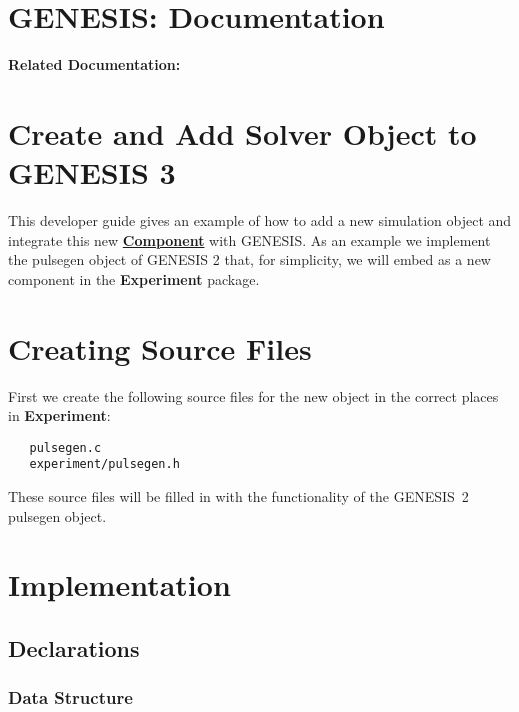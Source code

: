 \documentclass[12pt]{article}
\begin{document}
\section*{GENESIS: Documentation}

{\bf Related Documentation:}

\section*{Create and Add Solver Object to GENESIS 3}

This developer guide gives an example of how to add a new simulation
object and integrate this new
\href{../reserved-words/reserved-words.tex}{\bf Component} with
GENESIS.  As an example we implement the pulsegen object of GENESIS 2
that, for simplicity, we will embed as a new component in the {\bf
  Experiment} package.

\section*{Creating Source Files}

First we create the following source files for the new object in the correct places in {\bf Experiment}:
\begin{verbatim}
   pulsegen.c
   experiment/pulsegen.h
\end{verbatim}

These source files will be filled in with the functionality of the
GENESIS~2 pulsegen object.

\section*{Implementation}

\subsection*{Declarations}

\subsubsection*{Data Structure}
\end{document}
